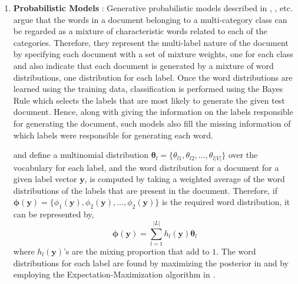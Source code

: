 \begin{enumerate}
\item{\textbf{Probabilistic Models} : }Generative probabilistic models described in \cite{mccallum1999multi}, \cite{nigam1999using}, \cite{ueda2002parametric} etc. argue that the words in a document belonging to a multi-category class can be regarded as a mixture of characteristic words related to each of the categories. Therefore, they represent the multi-label nature of the document by specifying each document with a set of mixture weights, one for each class and also indicate that each document is generated by a mixture of word distributions, one distribution for each label. Once the word distributions are learned using the training data, classification is performed using the Bayes Rule which selects the labels that are most likely to generate the given test document. Hence, along with giving the information on the labels responsible for generating the document, such models also fill the missing information of which labels were responsible for generating each word.

\cite{mccallum1999multi} and \cite{ueda2002parametric} define a multinomial distribution $\boldsymbol{\theta}_{l} = \{\theta_{l1}, \theta_{l2}, \ldots, \theta_{l|V|}\}$ over the vocabulary for each label, and the word distribution for a document for a given label vector $\boldsymbol{y}$, is computed by taking a weighted average of the word distributions of the labels that are present in the document. Therefore, if $\boldsymbol{\phi}(\boldsymbol{y}) = \{\phi_{1}(\boldsymbol{y}), \phi_{2}(\boldsymbol{y}), \ldots, \phi_{2}(\boldsymbol{y})\}$ is the required word distribution, it can be represented by, 
\begin{equation}
\boldsymbol{\phi}(\boldsymbol{y}) = \sum_{l=1}^{|L|} h_{l}(\boldsymbol{y})\boldsymbol{\theta}_{l}
\end{equation}
where $h_{l}(\boldsymbol{y})$'s are the mixing proportion that add to $1$. The word distributions for each label are found by maximizing the posterior in \citep{ueda2002parametric} and by employing the Expectation-Maximization algorithm in \citep{mccallum1999multi}.

\end{enumerate}
